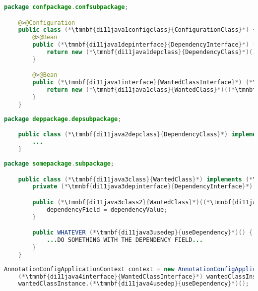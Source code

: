 \enlargethispage{10mm}
\thispagestyle{empty}
\begin{lstlisting}[language=Java, title={Configuration class}]
    package confpackage.confsubpackage;

    @>@Configuration
    public class (*\tmnbf{di11java1configclass}{ConfigurationClass}*) {
        @>@Bean
        public (*\tmnbf{di11java1depinterface}{DependencyInterface}*) (*\tmnbf{di11java1depbeanid}{dependencyBeanMethod}*)() {
            return new (*\tmnbf{di11java1depclass}{DependencyClass}*)(...);
        }

        @>@Bean
        public (*\tmnbf{di11java1interface}{WantedClassInterface}*) (*\tmnbf{di11java1beanid}{wantedBeanMethod}*)() {
            return new (*\tmnbf{di11java1class}{WantedClass}*)((*\tmnbf{di11java1depbeanid2}{dependencyBeanMethod}*)());
        }
    }
\end{lstlisting}
\begin{lstlisting}[language=Java, title={Dependency class}]
    package deppackage.depsubpackage;

    public class (*\tmnbf{di11java2depclass}{DependencyClass}*) implements (*\tmnbf{di11java2depinterface}{DependencyInterface}*) {
        ...
    }
\end{lstlisting}
\begin{lstlisting}[language=Java, title={Wanted class with the constructor}]
    package somepackage.subpackage;

    public class (*\tmnbf{di11java3class}{WantedClass}*) implements (*\tmnbf{di11java3interface}{WantedClassInterface}*) {
        private (*\tmnbf{di11java3depinterface}{DependencyInterface}*) dependencyField;

        public (*\tmnbf{di11java3class2}{WantedClass}*)((*\tmnbf{di11java3depinterface2}{DependencyInterface}*) dependencyValue) {
            dependencyField = dependencyValue;
        }

        public WHATEVER (*\tmnbf{di11java3usedep}{useDependency}*)() {
            ...DO SOMETHING WITH THE DEPENDENCY FIELD...
        }
    }
\end{lstlisting}
\begin{lstlisting}[language=Java, title={Usage}]
    AnnotationConfigApplicationContext context = new AnnotationConfigApplicationContext((*\tmnbf{di11java4configclass}{ConfigurationClass}*).class);
    (*\tmnbf{di11java4interface}{WantedClassInterface}*) wantedClassInstance = context.getBean("(*\tmnbf{di11java4beanid}{wantedBeanMethod}[ForestGreen]*)", (*\tmnbf{di11java4interface2}{WantedClassInterface}*).class);
    wantedClassInstance.(*\tmnbf{di11java4usedep}{useDependency}*)();
\end{lstlisting}
